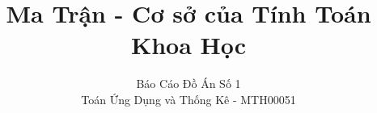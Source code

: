 \documentclass{reportDoCS2025}
\title{Ma Trận - Cơ sở của Tính Toán Khoa Học}
\subtitle{Báo Cáo Đồ Án Số 1 \\ Toán Ứng Dụng và Thống Kê - MTH00051}
\begin{document}
\cover
\numRoman

% 



\contents
\listTables
\listImages

% 

\pageNumber






% 



\end{document}

